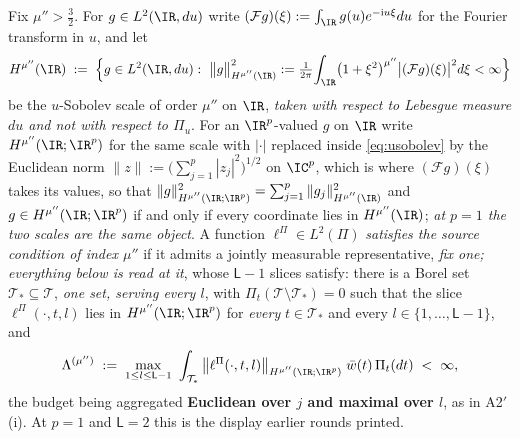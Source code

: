 \begin{assumption}\label{ass:reprsource}
Fix $\mu''>\tfrac32$. For $g\in L^{2}(\IR,du)$ write $(\mathcal Fg)(\xi):=\int_{\IR}g(u)e^{-\mathrm iu\xi}du$
for the Fourier transform in $u$, and let
\begin{equation}\label{eq:usobolev}
H^{\mu''}(\IR)\;:=\;\Big\{g\in L^{2}(\IR,du):\
\big\|g\big\|^{2}_{H^{\mu''}(\IR)}:=\tfrac{1}{2\pi}\!\int_{\IR}\!\big(1+\xi^{2}\big)^{\mu''}\big|(\mathcal Fg)(\xi)\big|^{2}d\xi<\infty\Big\}
\end{equation}
be the $u$-Sobolev scale of order $\mu''$ on $\IR$, \emph{taken with respect to Lebesgue measure $du$ and
not with respect to $\Pi_u$}. For an $\IR^{p}$-valued $g$ on $\IR$ write
$H^{\mu''}(\IR;\IR^{p})$ for the same scale with $|\cdot|$ replaced inside \eqref{eq:usobolev} by the
Euclidean norm $\|z\|:=\big(\sum_{j=1}^{p}|z_j|^{2}\big)^{1/2}$ on $\IC^{p}$, which is where
$(\mathcal Fg)(\xi)$ takes its values, so that
$\|g\|^{2}_{H^{\mu''}(\IR;\IR^{p})}=\sum_{j=1}^{p}\|g_j\|^{2}_{H^{\mu''}(\IR)}$ and
$g\in H^{\mu''}(\IR;\IR^{p})$ if and only if every coordinate lies in $H^{\mu''}(\IR)$;
\emph{at $p=1$ the two scales are the same object}.
A function $\ell^\Pi\in L^{2}(\Pi)$ \emph{satisfies the source condition of
index $\mu''$} if it admits a jointly measurable representative, \emph{fix one; everything below is
read at it}, whose $\mathsf L-1$ slices satisfy: there is a Borel set
$\mathcal T_\ast\subseteq\mathcal T$, \emph{one set, serving every $l$}, with
$\Pi_t(\mathcal T\setminus\mathcal T_\ast)=0$ such that the
slice $\ell^\Pi(\cdot,t,l)$ lies in $H^{\mu''}(\IR;\IR^{p})$ for \emph{every} $t\in\mathcal T_\ast$ and
every $l\in\{1,\dots,\mathsf L-1\}$, and
\begin{equation}\label{eq:lambdamu}
\Lambda^{(\mu'')}\;:=\;\max_{1\le l\le\mathsf L-1}\ \int_{\mathcal T_\ast}\big\|\ell^\Pi(\cdot,t,l)\big\|_{H^{\mu''}(\IR;\IR^{p})}\;\bar w(t)\,\Pi_t(dt)\;<\;\infty ,
\end{equation}
the budget being aggregated \textbf{Euclidean over $j$ and maximal over $l$}, as in A2$'$(i).
At $p=1$ and $\mathsf L=2$ this is the display earlier rounds printed.
\end{assumption}

